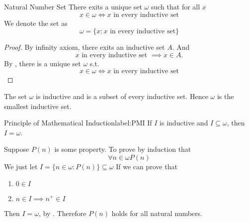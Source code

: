 \begin{definition}{Natural Number Set}{}
    There exits a unique set $\omega$ such that for all $x$
    \begin{equation*}
        x \in \omega \iff x \text{ in every inductive set}
    \end{equation*}
    We denote the set as 
    \begin{equation*}
        \omega = \{x : x \text{ in every inductive set}\}
    \end{equation*}
\end{definition}

\begin{proof}
    By infinity axiom, there exits an inductive set $A$. And
    \begin{equation*}
        x \text{ in every inductive set } \implies x \in A.
    \end{equation*}
    By , there is a unique set $\omega$ s.t.
    \begin{equation*}
        x \in \omega \iff x \text{ in every inductive set}
    \end{equation*}
\end{proof}

\begin{theorem}{}{}
    The set $\omega$ is inductive and is a subset of every inductive set. Hence $\omega$ is the smallest inductive set. 
\end{theorem}

\begin{corollary}{Principle of Mathematical Induction}{label:PMI}
    If $I$ is inductive and $I \subseteq \omega$, then $I = \omega$.
\end{corollary}
    
\begin{remarks}
    Suppose $P(n)$ is some property. To prove by induction that 
    \begin{equation*}
        \forall n \in \omega P(n)
    \end{equation*}
    We just let $I = \{n \in \omega : P(n)\} \subseteq \omega$ 
    If we can prove that 
    \begin{enumerate}

        \item $0 \in I$
        \item $n \in I \implies n^{+} \in I$

    \end{enumerate} 
    Then $I = \omega$, by . Therefore $P(n)$ holds
    for all natural numbers.
\end{remarks}

